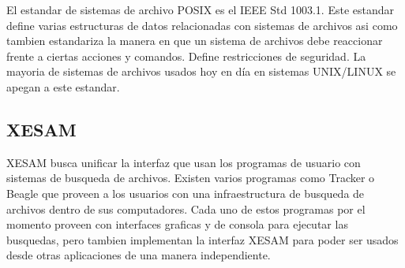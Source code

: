 El estandar de sistemas de archivo POSIX es el IEEE Std 1003.1. Este estandar define varias estructuras de datos relacionadas con sistemas de archivos asi como tambien estandariza la manera en que un sistema de archivos debe reaccionar frente a ciertas acciones y comandos. Define restricciones de seguridad. La mayoria de sistemas de archivos usados hoy en día en sistemas UNIX/LINUX se apegan a este estandar.

\subsection{XESAM}

XESAM busca unificar la interfaz que usan los programas de usuario con sistemas de busqueda de archivos. Existen varios programas como Tracker o Beagle que proveen a los usuarios con una infraestructura de busqueda de archivos dentro de sus computadores. Cada uno de estos programas por el momento proveen con interfaces graficas y de consola para ejecutar las busquedas, pero tambien implementan la interfaz XESAM para poder ser usados desde otras aplicaciones de una manera independiente.



